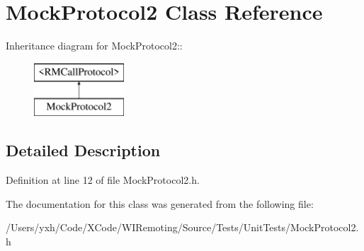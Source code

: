 \hypertarget{interface_mock_protocol2}{
\section{MockProtocol2 Class Reference}
\label{interface_mock_protocol2}
}
Inheritance diagram for MockProtocol2::\begin{figure}[H]
\begin{center}
\leavevmode
\includegraphics[height=2cm]{interface_mock_protocol2}
\end{center}
\end{figure}


\subsection{Detailed Description}


Definition at line 12 of file MockProtocol2.h.

The documentation for this class was generated from the following file:\begin{DoxyCompactItemize}
\item 
/Users/yxh/Code/XCode/WIRemoting/Source/Tests/UnitTests/MockProtocol2.h\end{DoxyCompactItemize}
